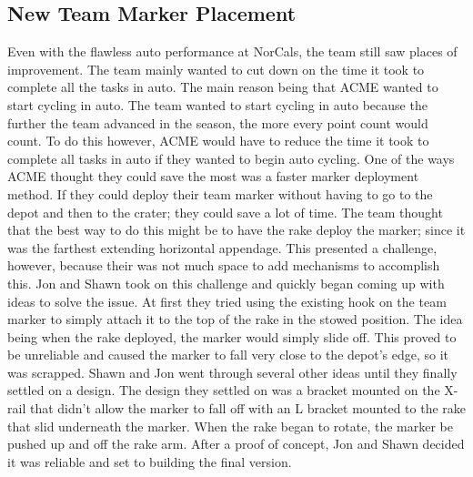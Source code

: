 \documentclass{article}
\begin{document}
\subsection{New Team Marker Placement}
Even with the flawless auto performance at NorCals, the team still saw places of improvement. The team mainly wanted to cut down on the time it took to complete all the tasks in auto. The main reason being that ACME wanted to start cycling in auto. The team wanted to start cycling in auto because the further the team advanced in the season, the more every point count would count. To do this however, ACME would have to reduce the time it took to complete all tasks in auto if they wanted to begin auto cycling. One of the ways ACME thought they could save the most was a faster marker deployment method. If they could deploy their team marker without having to go to the depot and then to the crater; they could save a lot of time. The team thought that the best way to do this might be to have the rake deploy the marker; since it was the farthest extending horizontal appendage. This presented a challenge, however, because their was not much space to add mechanisms to accomplish this. Jon and Shawn took on this challenge and quickly began coming up with ideas to solve the issue. At first they tried using the existing hook on the team marker to simply attach it to the top of the rake in the stowed position. The idea being when the rake deployed, the marker would simply slide off. This proved to be unreliable and caused the marker to fall very close to the depot's edge, so it was scrapped. Shawn and Jon went through several other ideas until they finally settled on a design. The design they settled on was a bracket mounted on the X-rail that didn't allow the marker to fall off with an L bracket mounted to the rake that slid underneath the marker. When the rake began to rotate, the marker be pushed up and off the rake arm. After a proof of concept, Jon and Shawn decided it was reliable and set to building the final version.
\end{document}
